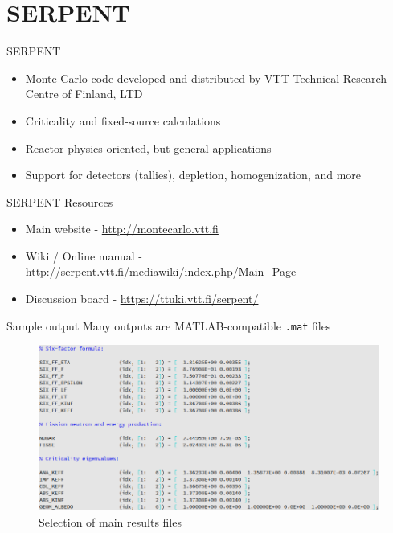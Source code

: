 \documentclass{beamer}
\begin{document}
\section{SERPENT}
\begin{frame}{SERPENT}
    \begin{itemize}
        \item Monte Carlo code developed and distributed by VTT Technical Research Centre of Finland, LTD
        \item Criticality and fixed-source calculations
        \item Reactor physics oriented, but general applications
        \item Support for detectors (tallies), depletion, homogenization, and more
    \end{itemize}
\end{frame}

\begin{frame}{SERPENT Resources}
    \begin{itemize}
        \item{Main website - \url{http://montecarlo.vtt.fi}}
        \item{Wiki / Online manual - \url{http://serpent.vtt.fi/mediawiki/index.php/Main_Page}}
        \item{Discussion board - \url{https://ttuki.vtt.fi/serpent/}}
    \end{itemize}
\end{frame}

\begin{frame}{Sample output}
    Many outputs are MATLAB-compatible \texttt{.mat} files
    \begin{figure}
        \centering
        \includegraphics[width=\linewidth]{./images/res.png}
        \caption{Selection of main results files}
    \end{figure}
\end{frame}
\end{document}
